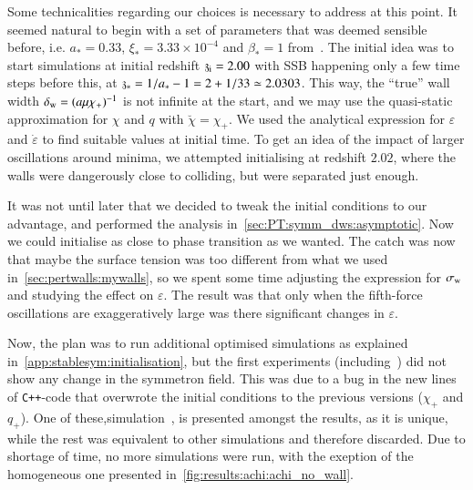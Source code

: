 


Some technicalities regarding our choices is necessary to address at this point. %
It seemed natural to begin with a set of parameters that was deemed sensible before, i.e. $a_\ast = 0.33$, $\xi_\ast = 3.33\times 10^{-4}$ and $\beta_\ast = 1$ from~\citet{christiansenAsevolutionRelativisticNbody2023}. %
The initial idea was to start simulations at initial redshift $\mathfrak{z}_\mathrm{i}=2.00$ with SSB happening only a few time steps before this, at $\mathfrak{z}_\ast = 1/a_\ast - 1 = 2 + 1/33 \simeq 2.0303$. This way, the ``true'' wall width $\delta_\mathrm{w} = (a\mu\chi_+)^{-1}$ is not infinite at the start, and we may use the quasi-static approximation for $\chi$ and $q$ with $\breve{\chi}= \chi_+$. We used the analytical expression for $\varepsilon$ and $\dot{\varepsilon}$ to find suitable values at initial time. To get an idea of the impact of larger oscillations around minima, we attempted initialising at redshift $2.02$, where the walls were dangerously close to colliding, but were separated just enough. 



It was not until later that we decided to tweak the initial conditions to our advantage, and performed the analysis in~\cref{sec:PT:symm_dws:asymptotic}. Now we could initialise as close to phase transition as we wanted. The catch was now that maybe the surface tension was too different from what we used in~\cref{sec:pertwalls:mywalls}, so we spent some time adjusting the expression for $\sigma_\mathrm{w}$ and studying the effect on $\varepsilon$. The result was that only when the fifth-force oscillations are exaggeratively large was there significant changes in $\varepsilon$. 



Now, the plan was to run additional optimised simulations as explained in~\cref{app:stablesym:initialisation}, but the first experiments (including~) did not show any change in the symmetron field. This was due to a bug in the new lines of \texttt{C++}-code that overwrote the initial conditions to the previous versions ($\chi_+$ and $q_+$). One of these,simulation~, is presented amongst the results, as it is unique, while the rest was equivalent to other simulations and therefore discarded. 
Due to shortage of time, no more simulations were run, with the exeption of the homogeneous one presented in~\cref{fig:results:achi:achi_no_wall}.





